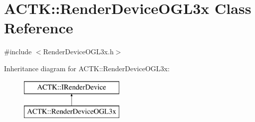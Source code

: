 \hypertarget{class_a_c_t_k_1_1_render_device_o_g_l3x}{\section{A\-C\-T\-K\-:\-:Render\-Device\-O\-G\-L3x Class Reference}
\label{class_a_c_t_k_1_1_render_device_o_g_l3x}
}


{\ttfamily \#include $<$Render\-Device\-O\-G\-L3x.\-h$>$}

Inheritance diagram for A\-C\-T\-K\-:\-:Render\-Device\-O\-G\-L3x\-:\begin{figure}[H]
\begin{center}
\leavevmode
\includegraphics[height=2.000000cm]{class_a_c_t_k_1_1_render_device_o_g_l3x}
\end{center}
\end{figure}
